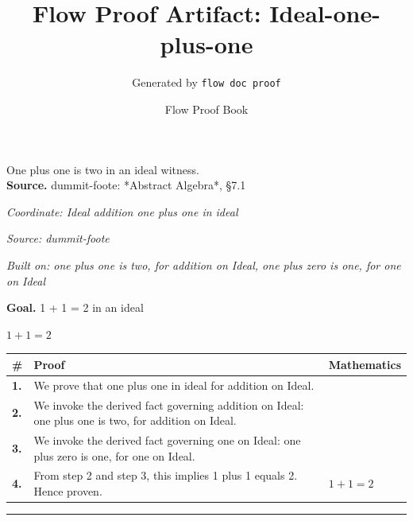 \documentclass[11pt]{article}
\title{Flow Proof Artifact: Ideal-one-plus-one}
\author{Generated by \texttt{flow doc proof}}
\date{Flow Proof Book}
\theoremstyle{definition}
\begin{document}
\maketitle
One plus one is two in an ideal witness.\\[0.5em]
\textbf{Source.} dummit-foote: *Abstract Algebra*, §7.1\\[0.5em]
\bigskip
{}\par
\smallskip\noindent\textit{Coordinate: Ideal \cdot addition \cdot one plus one in ideal}\par
\smallskip\noindent\textit{Source: dummit-foote}\par
\smallskip\noindent\textit{Built on: one plus one is two, for addition on Ideal, one plus zero is one, for one on Ideal}\par
\medskip
\noindent\textbf{Goal.} 1 + 1 = 2 in an ideal\par
\noindent$\displaystyle 1 + 1 = 2$\par
\medskip
\noindent
\begin{tabular}{@{} >{\raggedright\arraybackslash}p{} >{\raggedright\arraybackslash}p{} >{\raggedleft\arraybackslash}p{} @{}}
\textbf{\#} & \textbf{Proof} & \textbf{Mathematics} \\
\midrule
\textbf{1.} & We prove that one plus one in ideal for addition on Ideal. & \\[0.45em]
\textbf{2.} & We invoke the derived fact governing addition on Ideal: one plus one is two, for addition on Ideal. & \\[0.45em]
\textbf{3.} & We invoke the derived fact governing one on Ideal: one plus zero is one, for one on Ideal. & \\[0.45em]
\textbf{4.} & From step 2 and step 3, this implies 1 plus 1 equals 2. Hence proven. & $\displaystyle 1 + 1 = 2$ \\[0.45em]
\bottomrule
\end{tabular}
\label{thm:Ideal-addition-one_plus_one_in_ideal}
\par\medskip\hrule
\end{document}
